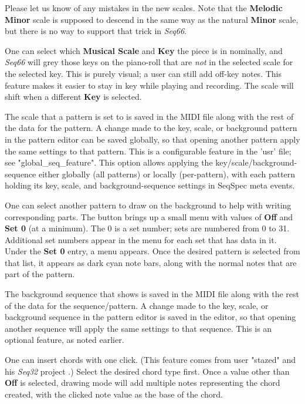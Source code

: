    Please let us know of any mistakes in the new scales.
   Note that the \textbf{Melodic Minor} scale is supposed to
   descend in the same way as the natural \textbf{Minor} scale, but
   there is no way to support that trick in \textsl{Seq66}.

   One can select which \textbf{Musical Scale} and
   \textbf{Key} the piece is in nominally,
   and \textsl{Seq66} will grey those keys on the piano-roll that
   are \textsl{not} in the selected scale for the selected key.
   This is purely visual; a user can still add off-key notes.
   This feature makes it easier to stay in key while playing and recording.
   The scale will shift when a different \textbf{Key} is selected.

   The scale that a pattern is set to is
   saved in the MIDI file along with the rest of the data for the pattern.
   A change made to the key, scale, or background pattern in
   the pattern editor can be saved globally, so that opening another pattern
   apply the same settings to that pattern.  This is a configurable feature in
   the 'usr' file; see "global\_seq\_feature".
   This option allows applying the key/scale/background-sequence
   either globally (all patterns) or locally (per-pattern), with each pattern
   holding its key, scale, and background-sequence settings in
   SeqSpec meta events.

   One can select another pattern to draw on the background to help with
   writing corresponding parts.
   The button brings up a small menu with values of \textbf{Off} and
   \textbf{Set 0} (at a minimum).
   The 0 is a set number; sets are numbered from 0 to 31.
   Additional set numbers appear in the menu for each set that has data in it.
   Under the \textbf{Set 0} entry, a menu appears.
   Once the desired pattern is selected from that list, it appears as dark cyan
   note bars, along with the normal notes that are part of the pattern.

   The background sequence that shows is saved in the MIDI file
   along with the rest of the data for the sequence/pattern.
   A change made to the key, scale, or background sequence in
   the pattern editor is saved in the editor, so that opening another sequence
   will apply the same settings to that sequence.
   This is an optional feature, as noted earlier.

   One can insert chords with one click.
   (This feature comes from user "stazed"
   and his \textsl{Seq32} project \cite{seq32}.)
   Select the desired chord type first.
   Once a value other than \textbf{Off} is selected,
   drawing mode will add multiple notes representing the chord
   created, with the clicked note value as the base of the chord.

